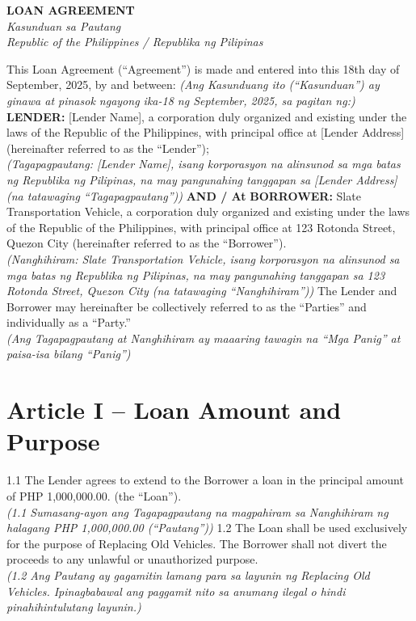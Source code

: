 \documentclass[a4paper,12pt]{article}
\begin{document}
\begin{center}
{\large \textbf{LOAN AGREEMENT}} \\
\textit{Kasunduan sa Pautang} \\
\textit{Republic of the Philippines / Republika ng Pilipinas}
\end{center}
\vspace{0.5cm}
This Loan Agreement (``Agreement'') is made and entered into this 18th day of September, 2025, by and between:
\textit{(Ang Kasunduang ito (``Kasunduan'') ay ginawa at pinasok ngayong ika-18 ng September, 2025, sa pagitan ng:)}
\vspace{0.5cm}
\textbf{LENDER:} [Lender Name], a corporation duly organized and existing under the laws of the Republic of the Philippines, with principal office at [Lender Address] (hereinafter referred to as the ``Lender''); \\
\textit{(Tagapagpautang: [Lender Name], isang korporasyon na alinsunod sa mga batas ng Republika ng Pilipinas, na may pangunahing tanggapan sa [Lender Address] (na tatawaging ``Tagapagpautang''))}
\vspace{0.3cm}
\textbf{AND / At}
\vspace{0.3cm}
\textbf{BORROWER:} Slate Transportation Vehicle, a corporation duly organized and existing under the laws of the Republic of the Philippines, with principal office at 123 Rotonda Street, Quezon City (hereinafter referred to as the ``Borrower''). \\
\textit{(Nanghihiram: Slate Transportation Vehicle, isang korporasyon na alinsunod sa mga batas ng Republika ng Pilipinas, na may pangunahing tanggapan sa 123 Rotonda Street, Quezon City (na tatawaging ``Nanghihiram''))}
\vspace{0.5cm}
The Lender and Borrower may hereinafter be collectively referred to as the ``Parties'' and individually as a ``Party.'' \\
\textit{(Ang Tagapagpautang at Nanghihiram ay maaaring tawagin na ``Mga Panig'' at paisa-isa bilang ``Panig'')}
\section*{Article I – Loan Amount and Purpose}
1.1 The Lender agrees to extend to the Borrower a loan in the principal amount of PHP 1,000,000.00. (the ``Loan''). \\
\textit{(1.1 Sumasang-ayon ang Tagapagpautang na magpahiram sa Nanghihiram ng halagang PHP 1,000,000.00 (``Pautang''))}
1.2 The Loan shall be used exclusively for the purpose of Replacing Old Vehicles. The Borrower shall not divert the proceeds to any unlawful or unauthorized purpose. \\
\textit{(1.2 Ang Pautang ay gagamitin lamang para sa layunin ng Replacing Old Vehicles. Ipinagbabawal ang paggamit nito sa anumang ilegal o hindi pinahihintulutang layunin.)}
\end{document}

